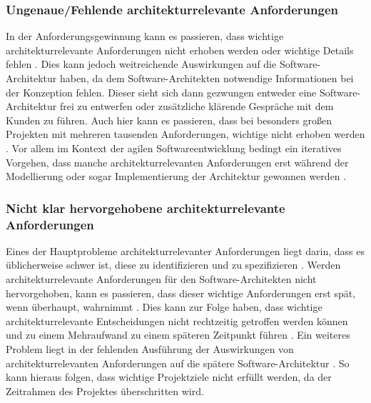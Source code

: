 \subsubsection{Ungenaue/Fehlende architekturrelevante Anforderungen}
In der Anforderungsgewinnung kann es passieren, dass wichtige architekturrelevante Anforderungen nicht erhoben werden oder wichtige Details fehlen \cite{Ros01}\cite{Ros02}. Dies kann jedoch weitreichende Auswirkungen auf die Software-Architektur haben, da dem Software-Architekten notwendige Informationen bei der Konzeption fehlen. Dieser sieht sich dann gezwungen entweder eine Software-Architektur frei zu entwerfen oder zus\"atzliche kl\"arende Gespr\"ache mit dem Kunden zu f\"uhren. Auch hier kann es passieren, dass bei besonders gro\ss{}en Projekten mit mehreren tausenden Anforderungen, wichtige nicht erhoben werden \cite{Gru01}. Vor allem im Kontext der agilen Softwareentwicklung bedingt ein iteratives Vorgehen, dass manche architekturrelevanten Anforderungen erst w\"ahrend der Modellierung oder sogar Implementierung der Architektur gewonnen werden \cite{Gru01}. \\

\subsubsection{Nicht klar hervorgehobene architekturrelevante Anforderungen}
Eines der Hauptprobleme architekturrelevanter Anforderungen liegt darin, dass es \"ublicherweise schwer ist, diese zu identifizieren und zu spezifizieren \cite{Gru01}. Werden architekturrelevante Anforderungen f\"ur den Software-Architekten nicht hervorgehoben, kann es passieren, dass dieser wichtige Anforderungen erst sp\"at, wenn \"uberhaupt, wahrnimmt \cite{Ros03}. Dies kann zur Folge haben, dass wichtige architekturrelevante Entscheidungen nicht rechtzeitig getroffen werden k\"onnen und zu einem Mehraufwand zu einem sp\"ateren Zeitpunkt f\"uhren \cite{Ros01}. Ein weiteres Problem liegt in der fehlenden Ausf\"uhrung der Auswirkungen von architekturrelevanten Anforderungen auf die sp\"atere Software-Architektur \cite{Ros03}. So kann hieraus folgen, dass wichtige Projektziele nicht erf\"ullt werden, da der Zeitrahmen des Projektes \"uberschritten wird. \\

